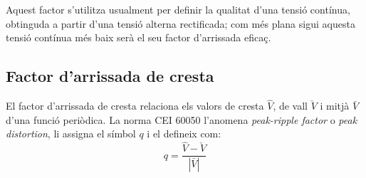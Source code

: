 Aquest factor s'utilitza usualment per definir la qualitat d'una
tensió contínua, obtinguda a partir  d'una tensió alterna rectificada; com més
plana sigui aquesta tensió contínua més baix serà el seu factor
d'arrissada eficaç.

\subsection{Factor d'arrissada de cresta}

El factor d'arrissada de cresta relaciona els valors de cresta $\hat{V}$, de vall $\check{V}$  i mitjà $\bar{V}$
 d'una funció periòdica. La norma CEI 60050 l'anomena \textit{peak-ripple factor} o \textit{peak distortion}, li assigna el símbol $q$ i el defineix com:
\begin{equation}
    q = \frac{\hat{V} - \check{V}}{|\bar{V}|}
\end{equation}


